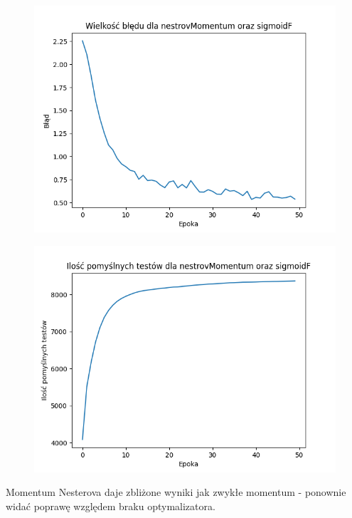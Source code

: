 \documentclass{article}
\begin{document}
\begin{figure}[!htb]
  \centering
  \includegraphics[width=\linewidth]{error_nestrovMomentum_sigmoidF.png}
\end{figure}

\begin{figure}[!htb]
  \centering
  \includegraphics[width=\linewidth]{test_nestrovMomentum_sigmoidF.png}
\end{figure}

Momentum Nesterova daje zbliżone wyniki jak zwykłe momentum - ponownie widać poprawę względem braku optymalizatora.
\end{document}
